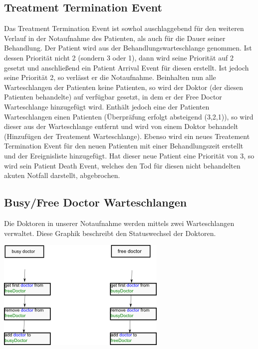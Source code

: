 \documentclass[12pt,fleqn,a4paper]{article}
\begin{document}
\begin{center}
\end{center}



\subsection{Treatment Termination Event}
Das Treatment Termination Event ist sowhol auschlaggebend f\"{u}r den weiteren Verlauf in der Notaufnahme des Patienten, als auch f\"{u}r die Dauer seiner Behandlung. Der Patient wird aus der Behandlungswarteschlange genommen. Ist dessen Priorit\"{a}t nicht 2 (sondern 3 oder 1), dann wird seine Priorit\"{a}t auf 2 gesetzt und anschlie\ss end ein Patient Arrival Event f\"{u}r diesen erstellt. Ist jedoch seine Priorit\"{a}t 2, so verl\"{a}sst er die Notaufnahme.
Beinhalten nun alle Warteschlangen der Patienten keine Patienten, so wird der Doktor (der diesen Patienten behandelte) auf verf\"{u}gbar gesetzt, in dem er der Free Doctor Warteschlange hinzugef\"{u}gt wird. Enth\"{a}lt jedoch eine der Patienten Warteschlangen einen Patienten (\"{U}berpr\"{a}fung erfolgt absteigend (3,2,1)),  so wird dieser aus der Warteschlange entfernt und wird von einem Doktor behandelt (Hinzuf\"{u}gen der Treatement Warteschlange). Ebenso wird ein neues Treatement Termination Event f\"{u}r den neuen Patienten mit einer Behandlungszeit erstellt und der Ereignisliste hinzugef\"{u}gt.
Hat dieser neue Patient eine Priorit\"{a}t von 3, so wird sein Patient Death Event, welches den Tod f\"{u}r diesen nicht behandelten akuten Notfall darstellt, abgebrochen.
\begin{center}
\end{center}



\subsection{Busy/Free Doctor Warteschlangen}
Die Doktoren in unserer Notaufnahme werden mittels zwei Warteschlangen verwaltet. Diese Graphik beschreibt den Statuswechsel der Doktoren.
\begin{center}
    \includegraphics[scale=1]{img/freeDoctor}
\end{center}
\end{document}
